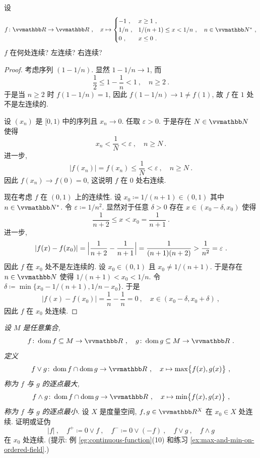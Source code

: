 \begin{exercise}
    设
    \[
        f \colon \R \to \R\ ,\quad x \mapsto
        \begin{cases}
            - 1\ ,   & x \geq 1\ , \\
            1 / n\ , & 1 / (n + 1) \leq x < 1 / n\ ,\quad n \in \N^\ast\ , \\
            0\ ,     & x \leq 0\ .
        \end{cases}
    \]
    \(f\) 在何处连续? 左连续? 右连续?
\end{exercise}

\begin{proof}
    考虑序列 \((1 - 1 / n)\). 显然 \(1 - 1 / n \to 1\), 而
    \[
        \frac{1}{2} \leq 1 - \frac{1}{n} < 1\ ,\quad n \geq 2\ .
    \]
    于是当 \(n \geq 2\) 时 \(f(1 - 1 / n) = 1\), 因此 \(f(1 - 1 / n) \to 1 \neq f(1)\), 故 \(f\) 在 \(1\) 处不是左连续的.

    设 \((x_n)\) 是 \([0, 1)\) 中的序列且 \(x_n \to 0\). 任取 \(\varepsilon > 0\). 于是存在 \(N \in \N\) 使得
    \[
        x_n < \frac{1}{N} < \varepsilon\ ,\quad n \geq N\ .
    \]
    进一步,
    \[
        |f(x_n)| = f(x_n) \leq \frac{1}{N} < \varepsilon\ ,\quad n \geq N\ .
    \]
    因此 \(f(x_n) \to f(0) = 0\), 这说明 \(f\) 在 \(0\) 处右连续.

    现在考虑 \(f\) 在 \((0, 1)\) 上的连续性. 设 \(x_0 \coloneqq 1 / (n + 1) \in (0, 1)\) 其中 \(n \in \N^\ast\). 令 \(\varepsilon \coloneqq 1 / n^2\). 显然对于任意 \(\delta > 0\) 存在 \(x \in (x_0 - \delta, x_0)\) 使得
    \[
        \frac{1}{n + 2} \leq x < x_0 = \frac{1}{n + 1}\ .
    \]
    进一步,
    \[
        |f(x) - f(x_0)| = \Bigl|\frac{1}{n + 2} - \frac{1}{n + 1}\Bigr| = \frac{1}{(n + 1)(n + 2)} > \frac{1}{n^2} = \varepsilon\ .
    \]
    因此 \(f\) 在 \(x_0\) 处不是左连续的. 设 \(x_0 \in (0, 1)\) 且 \(x_0 \neq 1 / (n + 1)\). 于是存在 \(n \in \N\) 使得 \(1 / (n + 1) < x_0 < 1 / n\). 令 \(\delta \coloneqq \min \bigl\{x_0 - 1 / (n + 1), 1 / n - x_0\bigr\}\). 于是
    \[
        |f(x) - f(x_0)| = \frac{1}{n} - \frac{1}{n} = 0\ ,\quad x \in (x_0 - \delta, x_0 + \delta)\ ,
    \]
    因此 \(f\) 在 \(x_0\) 处连续.
\end{proof}

\begin{exercise}
    \textsl{设 \(M\) 是任意集合,
    \[
        f \colon \dom f \subseteq M \to \R\ ,\quad g \colon \dom g \subseteq M \to \R\ .
    \]
    定义
    \[
        f \vee g \colon \dom f \cap \dom g \to \R\ ,\quad x \mapsto \max \bigl\{f(x), g(x)\bigr\}\ ,
    \]
    称为 \(f\) 与 \(g\) 的逐点最大,
    \[
        f \wedge g \colon \dom f \cap \dom g \to \R\ ,\quad x \mapsto \min \bigl\{f(x), g(x)\bigr\}\ ,
    \]
    称为 \(f\) 与 \(g\) 的逐点最小.} 设 \(X\) 是度量空间, \(f, g \in \R^X\) 在 \(x_0 \in X\) 处连续. 证明或证伪
    \[
        |f|\ ,\quad f^+ \coloneqq 0 \vee f\ ,\quad f^- \coloneqq 0 \vee (- f)\ ,\quad f \vee g\ ,\quad f \wedge g
    \]
    在 \(x_0\) 处连续. (提示: 例 \ref{eg:continuous-function}(10) 和练习 \ref{ex:max-and-min-on-ordered-ﬁeld}.)
\end{exercise}

